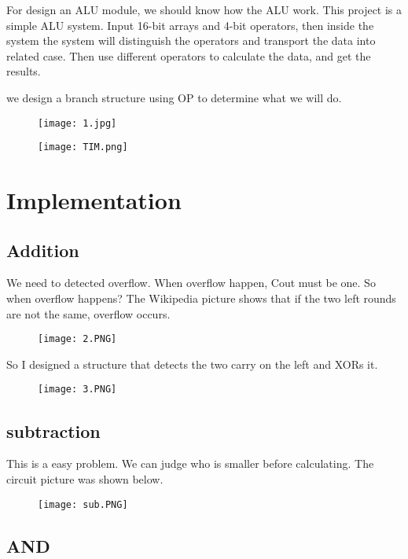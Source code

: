 \documentclass[12pt,a4paper]{article}
\begin{document}
For design an ALU module, we should know how the ALU work.
This project is a simple ALU system.
Input 16-bit arrays and 4-bit operators, then inside the system the system will distinguish the operators and transport the data into related case.
Then use different operators to calculate the data, and get the results.

we design a branch structure using OP to determine what we will do.
\begin{figure}[H]
  \centering
  \texttt{[image: 1.jpg]}
  \end{figure}

\begin{figure}[H]
  \centering
  \texttt{[image: TIM.png]}
  \end{figure}

\newpage

\section{Implementation}
\subsection{Addition}

We need to detected overflow.
When overflow happen, Cout must be one.
So when overflow happens?
The Wikipedia picture shows that if the two left rounds are not the same, overflow occurs.
\begin{figure}[H]
  \centering
  \texttt{[image: 2.PNG]}
  \end{figure}
So I designed a structure that detects the two carry on the left and XORs it.
\begin{figure}[H]
  \centering
  \texttt{[image: 3.PNG]}
  \end{figure}

\subsection{subtraction}

This is a easy problem.
We can judge who is smaller before calculating.
The circuit picture was shown below.
\begin{figure}[H]
  \centering
  \texttt{[image: sub.PNG]}
  \end{figure}

\subsection{AND}
\end{document}

